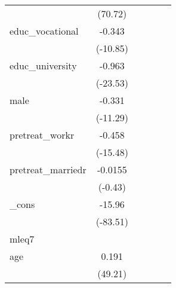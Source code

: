 {\begin{tabular}{l*{5}{c}}
            &     (70.72)         &                     &                     &                     &                     \\
[1em]
educ\_vocational&      -0.343\sym{***}&                     &                     &                     &                     \\
            &    (-10.85)         &                     &                     &                     &                     \\
[1em]
educ\_university&      -0.963\sym{***}&                     &                     &                     &                     \\
            &    (-23.53)         &                     &                     &                     &                     \\
[1em]
male        &      -0.331\sym{***}&                     &                     &                     &                     \\
            &    (-11.29)         &                     &                     &                     &                     \\
[1em]
pretreat\_workr&      -0.458\sym{***}&                     &                     &                     &                     \\
            &    (-15.48)         &                     &                     &                     &                     \\
[1em]
pretreat\_marriedr&     -0.0155         &                     &                     &                     &                     \\
            &     (-0.43)         &                     &                     &                     &                     \\
[1em]
\_cons      &      -15.96\sym{***}&                     &                     &                     &                     \\
            &    (-83.51)         &                     &                     &                     &                     \\
\hline
mleq7       &                     &                     &                     &                     &                     \\
age         &       0.191\sym{***}&                     &                     &                     &                     \\
            &     (49.21)         &                     &                     &                     &                     \\

\end{tabular}}
